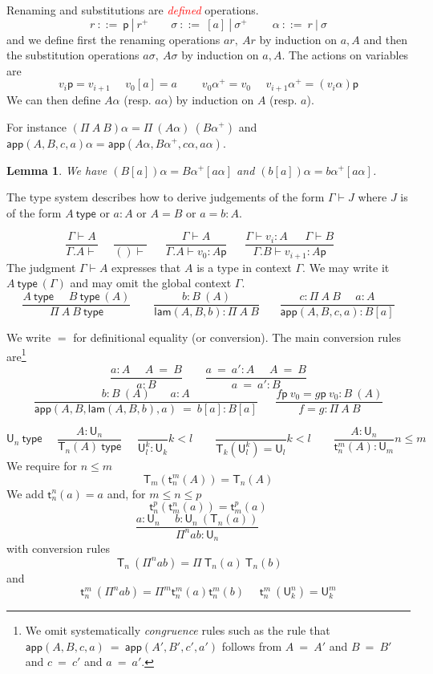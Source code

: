 \documentclass[11pt,a4paper]{article}
\newtheorem{lemma}{Lemma}[theorem]
\theoremstyle{definition}
\newcommand{\conv}{=}
\def\UU{\mathsf{U}}
\newcommand{\type}{\mathsf{type}}
\newcommand{\LAM}{\mathsf{lam}}
\newcommand{\APP}{\mathsf{app}}
\newcommand{\T}{\mathsf{T}}
\newcommand{\sT}{\mathsf{t}}
\newcommand{\pp}{\mathsf{p}}
\newcommand{\EMP}[1]{\emph{\textcolor{red}{#1}}}
\begin{document}
\medskip

Renaming and substitutions are \EMP{defined} operations. 
$$
r~::=~\pp~|~r^+~~~~~~~~~\sigma~::=~[a]~|~\sigma^+~~~~~~~~~~\alpha~::=~r~|~\sigma
$$
and we define first the renaming operations $ar,~Ar$ by induction on $a,A$ and then the substitution operations
$a\sigma,~A\sigma$ by induction on $a,A$. The actions on variables are
$$
v_i\pp = v_{i+1}~~~~~~v_0[a] = a~~~~~~~~~~v_0\alpha^+ = v_0~~~~~~v_{i+1}\alpha^+ = (v_i\alpha)\pp
$$
We can then define $A\alpha$ (resp. $a\alpha$) by induction on $A$ (resp. $a$).

For instance $(\Pi~A~B)\alpha = \Pi~(A\alpha)~(B\alpha^+)$
and $\APP(A,B,c,a)\alpha = \APP(A\alpha,B\alpha^+,c\alpha,a\alpha)$.

\begin{lemma}
  We have $(B[a])\alpha = B\alpha^+[a\alpha]$ and $(b[a])\alpha = b\alpha^+[a\alpha]$.
\end{lemma}


\medskip

The type system describes how to derive judgements of the form $\Gamma\vdash J$ where $J$ is of the form
$A~\type$ or $a:A$ or $A=B$ or $a=b : A$.

\medskip

$$
\frac{\Gamma\vdash A}{\Gamma.A\vdash}~~~~~~\frac{}{()\vdash}~~~~~~~
\frac{\Gamma\vdash A}{\Gamma.A\vdash v_0:A\pp}~~~~~~~
\frac{\Gamma\vdash v_i:A~~~~~~~\Gamma\vdash B}{\Gamma.B\vdash v_{i+1}:A\pp}~~~~~~~
$$
The judgment $\Gamma\vdash A$ expresses that $A$ is a type in context $\Gamma$.
We may write it $A~\type~(\Gamma)$ and may omit the global context $\Gamma$.
$$
\frac{A~\type~~~~~~B~\type~(A)}{\Pi~A~B~\type}~~~~~~~~~
\frac{b:B~(A)}{\LAM(A,B,b):\Pi~A~B}~~~~~~~~
\frac{c:\Pi~A~B~~~~~~a:A}
     {\APP(A,B,c,a):B[a]}
$$

We write $\conv$ for definitional equality (or conversion).
The main conversion rules are\footnote{We omit systematically {\em congruence} rules
such as the rule that $\APP(A,B,c,a)~\conv~\APP(A',B',c',a')$ follows from
$A~\conv~A'$ and $B~\conv~B'$ and $c~\conv~c'$ and $a~\conv~a'$.}
$$
\frac{ a:A~~~~~~ A~ \conv~ B}{ a:B}~~~~~~~~~
\frac{ a ~\conv~a':A~~~~~~ A  ~\conv~ B}{ a ~\conv~a':B}
$$
$$
\frac{b:B~(A)~~~~~~~~ a:A}{ \APP(A,B,\LAM(A,B,b),a)  ~\conv~ b[a]:B[a]}
~~~~~~~
\frac{f\pp~v_0 = g\pp~v_0:B~(A)}{ f = g : \Pi~A~B}
$$


$$
\UU_n~\type~~~~~~
\frac{A:\UU_{n}}{\T_{n}(A)~\type}~~~~~~
\frac{}{\UU^{k}_l:\UU_{k}}k<l~~~~~~~~~\frac{}{\T_{k}({\UU^{k}_l}) = \UU_{l}}k<l
~~~~~~~~~\frac{A:\UU_{n}}
{\sT_{n}^{m}(A):\UU_{m}}
n\leqslant m
$$
We require for $n\leqslant m$
\[
\T_m(\sT_{n}^{m}(A)) = \T_{n}(A) 
\]
We add  $\sT_{n}^n(a) = a$ and, for $m\leqslant n\leqslant p$
$$
 \sT_{n}^p(\sT_{m}^n(a)) = \sT_m^p(a)
$$
$$
\frac{a:\UU_{n}~~~~~~b:\UU_n~(\T_{n}(a))}
     {\Pi^{n} a b:\UU_{n}}~~~~~~~~~
$$
with conversion rules
$$
\T_{n}~(\Pi^{n} a b) = \Pi~{\T_{n}(a)}~{\T_{n}(b)}~~~~~~~
$$
and
$$
\sT_{n}^{m}~(\Pi^{n} a b) = \Pi^{m} \sT_{n}^{m}(a) \sT_{n}^{m}(b)~~~~~~
\sT_{n}^{m}~(\UU^{n}_k) = \UU^m_k
$$
\end{document}
